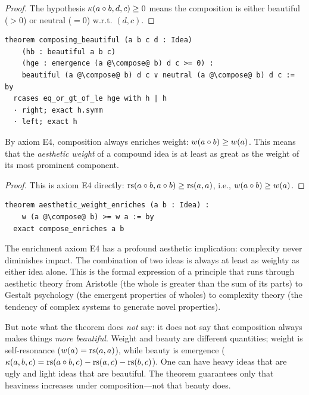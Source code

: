 \begin{proof}
The hypothesis $\kappa(a \circ b, d, c) \geq 0$ means the composition
is either beautiful ($> 0$) or neutral ($= 0$) w.r.t. $(d, c)$.
\end{proof}

\begin{lstlisting}
theorem composing_beautiful (a b c d : Idea)
    (hb : beautiful a b c)
    (hge : emergence (a @\compose@ b) d c >= 0) :
    beautiful (a @\compose@ b) d c ∨ neutral (a @\compose@ b) d c := by
  rcases eq_or_gt_of_le hge with h | h
  · right; exact h.symm
  · left; exact h
\end{lstlisting}

\begin{theorem}
\label{thm:e4-aesthetic-weight}
By axiom E4, composition always enriches weight:
$w(a \circ b) \geq w(a)$.  This means that the \emph{aesthetic weight}
of a compound idea is at least as great as the weight of its most
prominent component.
\end{theorem}

\begin{proof}
This is axiom E4 directly: $\mathrm{rs}(a \circ b, a \circ b) \geq
\mathrm{rs}(a, a)$, i.e., $w(a \circ b) \geq w(a)$.
\end{proof}

\begin{lstlisting}
theorem aesthetic_weight_enriches (a b : Idea) :
    w (a @\compose@ b) >= w a := by
  exact compose_enriches a b
\end{lstlisting}

\begin{interpretation}
\label{int:e4-aesthetic}
The enrichment axiom E4 has a profound aesthetic implication: complexity
never diminishes impact.  The combination of two ideas is always at
least as weighty as either idea alone.  This is the formal expression
of a principle that runs through aesthetic theory from Aristotle
(the whole is greater than the sum of its parts) to Gestalt psychology
(the emergent properties of wholes) to complexity theory (the tendency
of complex systems to generate novel properties).

But note what the theorem does \emph{not} say: it does not say that
composition always makes things \emph{more beautiful}.  Weight and
beauty are different quantities; weight is self-resonance ($w(a) =
\mathrm{rs}(a, a)$), while beauty is emergence ($\kappa(a, b, c) =
\mathrm{rs}(a \circ b, c) - \mathrm{rs}(a, c) - \mathrm{rs}(b, c)$).  One can have heavy
ideas that are ugly and light ideas that are beautiful.  The theorem
guarantees only that heaviness increases under composition---not that
beauty does.
\end{interpretation}

